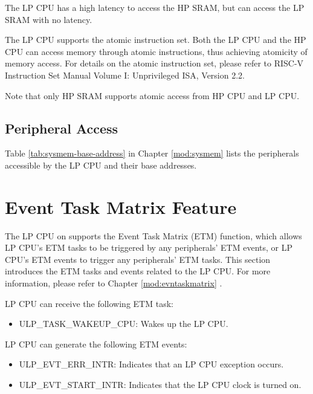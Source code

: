 \documentclass[main\_\_EN.tex]{subfiles}
\begin{document}
\begin{tiplisting}
The LP CPU has a high latency to access the HP SRAM, but can access the LP SRAM with no latency.
\end{tiplisting}

The LP CPU supports the atomic instruction set. Both the LP CPU and the HP CPU can access memory through atomic instructions, thus achieving atomicity of memory access. For details on the atomic instruction set, please refer to RISC-V Instruction Set Manual Volume I: Unprivileged ISA, Version 2.2.

Note that only HP SRAM supports atomic access from HP CPU and LP CPU.

\subsection{Peripheral Access}

Table \ref{tab:sysmem-base-address} in Chapter \ref{mod:sysmem} \textit{} lists the peripherals accessible by the LP CPU and their base addresses.

\section{Event Task Matrix Feature}
\label{sec:etm-func}

The LP CPU on \chipname{} supports the Event Task Matrix (ETM) function, which allows LP CPU's ETM tasks to be triggered by any peripherals' ETM events, or LP CPU's ETM events to trigger any peripherals' ETM tasks. This section introduces the ETM tasks and events related to the LP CPU. For more information, please refer to Chapter \ref{mod:evntaskmatrix} .

LP CPU can receive the following ETM task:

\begin{itemize}
    \item ULP\_TASK\_WAKEUP\_CPU: Wakes up the LP CPU.
\end{itemize}

LP CPU can generate the following ETM events:

\begin{itemize}
    \item ULP\_EVT\_ERR\_INTR: Indicates that an LP CPU exception occurs.
    \item ULP\_EVT\_START\_INTR: Indicates that the LP CPU clock is turned on.
\end{itemize}
\end{document}
